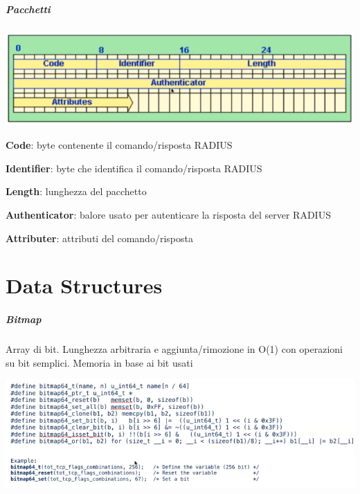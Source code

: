 \documentclass[10pt]{book}
\begin{document}
\paragraph{Pacchetti} \begin{center}
	\includegraphics[scale=0.75]{radiuspkt.png}
\end{center}
\begin{list}{}{}
	\item \textbf{Code}: byte contenente il comando/risposta RADIUS
	\item \textbf{Identifier}: byte che identifica il comando/risposta RADIUS
	\item \textbf{Length}: lunghezza del pacchetto
	\item \textbf{Authenticator}: balore usato per autenticare la risposta del server RADIUS
	\item \textbf{Attributer}: attributi del comando/risposta
\end{list}
\chapter{Data Structures}
\paragraph{Bitmap} Array di bit. Lunghezza arbitraria e aggiunta/rimozione in O(1) con operazioni su bit semplici. Memoria in base ai bit usati
\begin{center}
	\includegraphics[scale=0.75]{bitmap.png}
\end{center}
\end{document}
